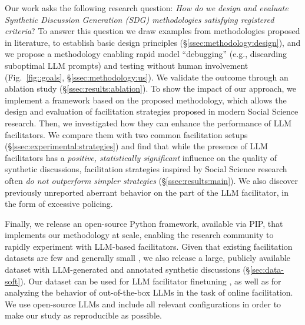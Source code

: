 Our work asks the following research question: \emph{How do we design and evaluate Synthetic Discussion Generation (SDG) methodologies satisfying registered criteria}? To answer this question we draw examples from methodologies proposed in literature, to establish basic design principles (\S\ref{ssec:methodology:design}), and we propose a methodology enabling rapid model ``debugging'' (e.g., discarding suboptimal LLM prompts) and testing without human involvement (Fig.~\ref{fig::goals}, \S\ref{ssec:methodology:us}). We validate the outcome through an ablation study (\S\ref{ssec:results:ablation}). To show the impact of our approach, we implement a framework based on the proposed methodology, which allows the design and evaluation of facilitation strategies proposed in modern Social Science research. Then, we investigated how they can enhance the performance of LLM facilitators. We compare them with two common facilitation setups (\S\ref{ssec:experimental:strategies}) and find that while the presence of LLM facilitators has a \emph{positive, statistically significant} influence on the quality of synthetic discussions, facilitation strategies inspired by Social Science research often \emph{do not outperform simpler strategies} (\S\ref{ssec:results:main}). We also discover previously unreported aberrant behavior on the part of the LLM facilitator, in the form of excessive policing.

Finally, we release an open-source Python framework, available via PIP, that implements our methodology at scale, enabling the research community to rapidly experiment with LLM-based facilitators. Given that existing facilitation datasets are few and generally small \citep{korre2025evaluation}, we also release \vmd a large, publicly available dataset with LLM-generated and annotated synthetic discussions (\S\ref{sec:data-soft}). Our dataset can be used for LLM facilitator finetuning \cite{ulmer2024}, as well as for analyzing the behavior of out-of-the-box LLMs in the task of online facilitation. We use open-source LLMs and include all relevant configurations in order to make our study as reproducible as possible.
